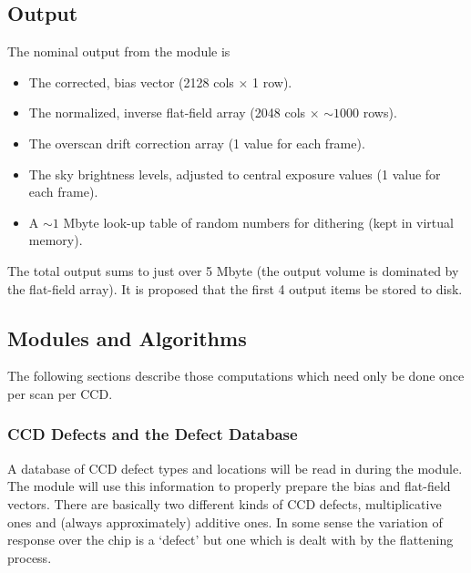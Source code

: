 \subsection{Output}

The nominal output from the {\icfrm} module is

\begin{itemize}

\item The corrected, bias vector (2128 cols $\times$ 1 row).
\item The normalized, inverse flat-field array (2048 cols $\times$ $\sim1000$
rows).
\item The overscan drift correction array (1 value for each frame).
\item The sky brightness levels, adjusted to central exposure values
(1 value for each frame). 
\item A $\sim1$ Mbyte look-up table of random numbers for dithering
(kept in virtual memory).

\end{itemize}

The total output sums to just over 5 Mbyte (the output volume is
dominated by the flat-field array). It is proposed that the first
4 output items be stored to disk. 

\subsection{Modules and Algorithms}

The following sections describe those computations which
need only be done once per scan per CCD.

\subsubsection{CCD Defects and the Defect Database}

A database of CCD defect types and locations will be read in during
the \icfrm module. The \icfrm module will use this information
to properly prepare the bias and flat-field vectors.
There are basically two different kinds of CCD
defects, multiplicative ones and (always approximately) additive ones.
In some sense the variation of response over the chip is a `defect' but
one which is dealt with by the flattening process.
 
